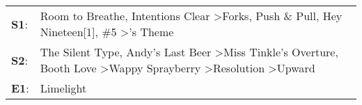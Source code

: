 \begin{supertabular}{p{0.03\textwidth}p{0.92\textwidth}}
 \textbf{S1}:  &                                             Room to Breathe\textsuperscript{}, \enspace Intentions Clear\textsuperscript{} \textgreater \enspace Forks\textsuperscript{}, \enspace Push \& Pull\textsuperscript{}, \enspace Hey Nineteen[1]\textsuperscript{}, \enspace \#5\textsuperscript{} \textgreater {}'s Theme\textsuperscript{}  \enspace  \\
 \textbf{S2}:  &  The Silent Type\textsuperscript{}, \enspace Andy's Last Beer\textsuperscript{} \textgreater \enspace Miss Tinkle's Overture\textsuperscript{}, \enspace Booth Love\textsuperscript{} \textgreater \enspace Wappy Sprayberry\textsuperscript{} \textgreater \enspace Resolution\textsuperscript{} \textgreater \enspace Upward\textsuperscript{}  \enspace  \\
 \textbf{E1}:  &                                                                                                                                                                                                                                                                                                                      Limelight\textsuperscript{}  \enspace  \\
\end{supertabular}
